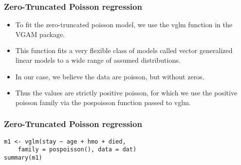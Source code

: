 \documentclass[MASTER.tex]{subfiles}
\begin{document}
\begin{frame}[fragile]
	\frametitle{Zero-Truncated Poisson regression}
\begin{itemize}
\item To fit the zero-truncated poisson model, we use the vglm function in the VGAM package. 
\item This function fits a very flexible class of models called vector generalized linear models to a wide range of assumed distributions. 
\item In our case, we believe the data are poisson, but without zeros. 
\item Thus the values are strictly positive poisson, for which we use the positive poisson family via the pospoisson function passed to vglm.
\end{itemize}
\end{frame}
\begin{frame}[fragile]
	\frametitle{Zero-Truncated Poisson regression}
\begin{verbatim}
m1 <- vglm(stay ~ age + hmo + died, 
    family = pospoisson(), data = dat)
summary(m1)
\end{verbatim}
\end{frame}
\end{document}

